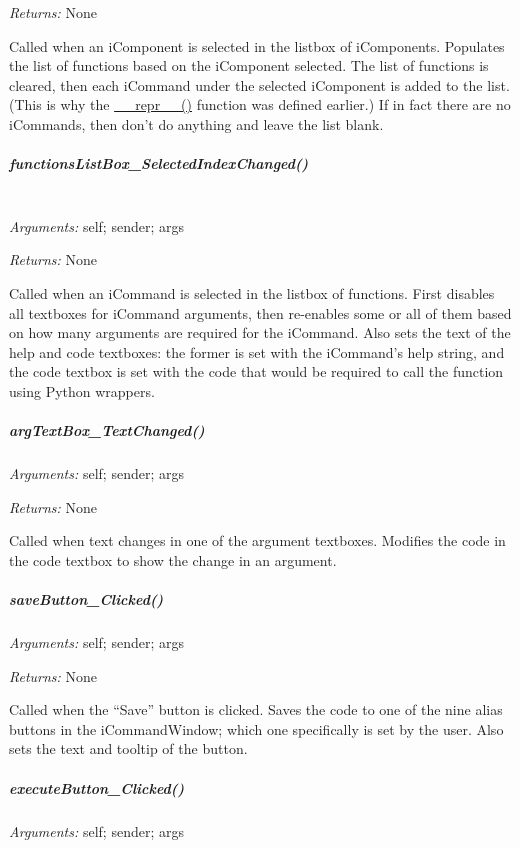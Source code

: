 \documentclass[12pt,letterpaper]{article}
\begin{document}
\emph{Returns:} None

Called when an iComponent is selected in the listbox of iComponents. Populates the list of functions based on the iComponent selected. The list of functions is cleared, then each iCommand under the selected iComponent is added to the list. (This is why the \hyperref[4.5.1.0.1]{\_\_repr\_\_()} function was defined earlier.) If in fact there are no iCommands, then don't do anything and leave the list blank.



%
%
\subparagraph{functionsListBox\_SelectedIndexChanged()}
\label{4.5.1.1.3}

\textcolor{white}{dummy} \\ \emph{Arguments:} self; sender; args

\emph{Returns:} None

Called when an iCommand is selected in the listbox of functions. First disables all textboxes for iCommand arguments, then re-enables some or all of them based on how many arguments are required for the iCommand. Also sets the text of the help and code textboxes: the former is set with the iCommand's help string, and the code textbox is set with the code that would be required to call the function using Python wrappers.



%
%
\subparagraph{argTextBox\_TextChanged()}
\label{4.5.1.1.4}

\emph{Arguments:} self; sender; args

\emph{Returns:} None

Called when text changes in one of the argument textboxes. Modifies the code in the code textbox to show the change in an argument.



%
%
\subparagraph{saveButton\_Clicked()}
\label{4.5.1.1.5}

\emph{Arguments:} self; sender; args

\emph{Returns:} None

Called when the ``Save'' button is clicked. Saves the code to one of the nine alias buttons in the iCommandWindow; which one specifically is set by the user. Also sets the text and tooltip of the button.



%
%
\subparagraph{executeButton\_Clicked()}
\label{4.5.1.1.6}

\emph{Arguments:} self; sender; args
\end{document}
